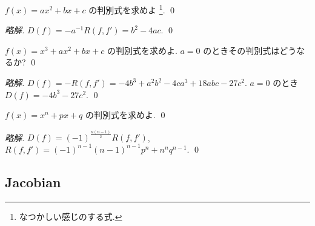 \documentclass[12pt,twoside]{jarticle}
\newcommand\commentout[1]{#1}
\newcommand\commentout[1]{}
\begin{document}
\begin{question}
  \label{q:b^2-4ac}
  $f(x)=ax^2+bx+c$ の判別式を求めよ
  \footnote{なつかしい感じのする式.}. \qed
\end{question}

\commentout{
\begin{proof}[略解]
  $D(f)=-a^{-1}R(f,f') = b^2 - 4ac$. \qed
\end{proof}
}

\begin{question}
  \label{q:-4b^3-27c^2}
  $f(x)=x^3+ax^2+bx+c$ の判別式を求めよ. 
  $a=0$ のときその判別式はどうなるか?
  \qed
\end{question}

\commentout{
\begin{proof}[略解]
  $D(f)=-R(f,f')= -4b^3 + a^2b^2 - 4ca^3 + 18abc - 27c^2$. 
  $a=0$ のとき $D(f)=-4b^3-27c^2$.
  \qed
\end{proof}
}

\begin{question}
  \label{q:x^n+px+q}
  $f(x)=x^n+px+q$ の判別式を求めよ. \qed
\end{question}

\commentout{
\begin{proof}[略解]
  $D(f)=(-1)^{\frac{n(n-1)}{2}}R(f,f')$,
  $R(f,f') = (-1)^{n-1}(n-1)^{n-1}p^n+n^nq^{n-1}$. 
  \qed
\end{proof}
}


\subsection{Jacobian}
\end{document}
